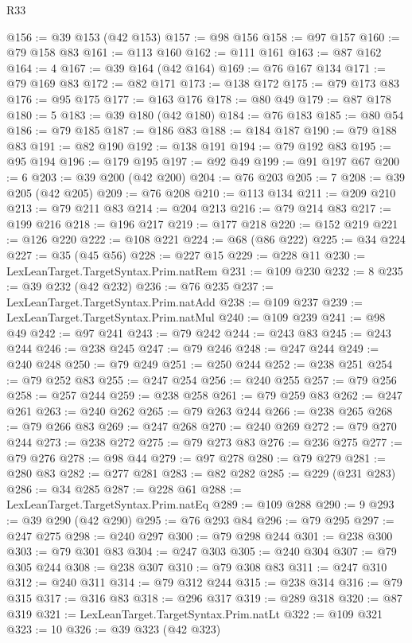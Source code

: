 \begin{lexlean}{R33}
\begin{coremodule}
@156 := @39 @153 (@42 @153)
@157 := @98 @156
@158 := @97 @157
@160 := @79 @158 @83
@161 := @113 @160
@162 := @111 @161
@163 := @87 @162
@164 := 4
@167 := @39 @164 (@42 @164)
@169 := @76 @167 @134
@171 := @79 @169 @83
@172 := @82 @171
@173 := @138 @172
@175 := @79 @173 @83
@176 := @95 @175
@177 := @163 @176
@178 := @80 @49
@179 := @87 @178
@180 := 5
@183 := @39 @180 (@42 @180)
@184 := @76 @183
@185 := @80 @54
@186 := @79 @185
@187 := @186 @83
@188 := @184 @187
@190 := @79 @188 @83
@191 := @82 @190
@192 := @138 @191
@194 := @79 @192 @83
@195 := @95 @194
@196 := @179 @195
@197 := @92 @49
@199 := @91 @197 @67
@200 := 6
@203 := @39 @200 (@42 @200)
@204 := @76 @203
@205 := 7
@208 := @39 @205 (@42 @205)
@209 := @76 @208
@210 := @113 @134
@211 := @209 @210
@213 := @79 @211 @83
@214 := @204 @213
@216 := @79 @214 @83
@217 := @199 @216
@218 := @196 @217
@219 := @177 @218
@220 := @152 @219
@221 := @126 @220
@222 := @108 @221
@224 := @68 (@86 @222)
@225 := @34 @224
@227 := @35 (@45 @56)
@228 := @227 @15
@229 := @228 @11
@230 := LexLeanTarget.TargetSyntax.Prim.natRem
@231 := @109 @230
@232 := 8
@235 := @39 @232 (@42 @232)
@236 := @76 @235
@237 := LexLeanTarget.TargetSyntax.Prim.natAdd
@238 := @109 @237
@239 := LexLeanTarget.TargetSyntax.Prim.natMul
@240 := @109 @239
@241 := @98 @49
@242 := @97 @241
@243 := @79 @242
@244 := @243 @83
@245 := @243 @244
@246 := @238 @245
@247 := @79 @246
@248 := @247 @244
@249 := @240 @248
@250 := @79 @249
@251 := @250 @244
@252 := @238 @251
@254 := @79 @252 @83
@255 := @247 @254
@256 := @240 @255
@257 := @79 @256
@258 := @257 @244
@259 := @238 @258
@261 := @79 @259 @83
@262 := @247 @261
@263 := @240 @262
@265 := @79 @263 @244
@266 := @238 @265
@268 := @79 @266 @83
@269 := @247 @268
@270 := @240 @269
@272 := @79 @270 @244
@273 := @238 @272
@275 := @79 @273 @83
@276 := @236 @275
@277 := @79 @276
@278 := @98 @44
@279 := @97 @278
@280 := @79 @279
@281 := @280 @83
@282 := @277 @281
@283 := @82 @282
@285 := @229 (@231 @283)
@286 := @34 @285
@287 := @228 @61
@288 := LexLeanTarget.TargetSyntax.Prim.natEq
@289 := @109 @288
@290 := 9
@293 := @39 @290 (@42 @290)
@295 := @76 @293 @84
@296 := @79 @295
@297 := @247 @275
@298 := @240 @297
@300 := @79 @298 @244
@301 := @238 @300
@303 := @79 @301 @83
@304 := @247 @303
@305 := @240 @304
@307 := @79 @305 @244
@308 := @238 @307
@310 := @79 @308 @83
@311 := @247 @310
@312 := @240 @311
@314 := @79 @312 @244
@315 := @238 @314
@316 := @79 @315
@317 := @316 @83
@318 := @296 @317
@319 := @289 @318
@320 := @87 @319
@321 := LexLeanTarget.TargetSyntax.Prim.natLt
@322 := @109 @321
@323 := 10
@326 := @39 @323 (@42 @323)

\end{coremodule}
\end{lexlean}
